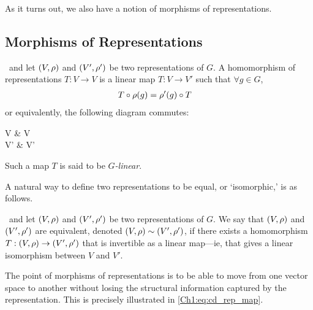 As it turns out, we also have a notion of morphisms of representations.

\subsection{Morphisms of Representations}

\begin{boxdefinition}
    \ and let $\left( V,\rho \right)$ and $\left( V',\rho' \right)$ be two representations of $G$. A homomorphism of representations $T : V \to V$ is a linear map $T : V \to V'$ such that $\forall g \in G$,
    \begin{align*}
        T \circ \rho\!\left( g \right) &= \rho'(g) \circ T
    \end{align*}
    or equivalently, the following diagram commutes:
    \begin{cd}
        V \arrow[r, "\rho(g)"] \arrow[d, "T"'] & V \arrow[d, "T"] \\
        V' \arrow[r, "\rho'(g)"'] & V'
        \label{Ch1:eq:cd_rep_map}
    \end{cd}
    Such a map $T$ is said to be \textit{$G$-linear}.
\end{boxdefinition}

A natural way to define two representations to be equal, or `isomorphic,' is as follows.

\begin{definition}
    \ and let $\left( V,\rho \right)$ and $\left( V',\rho' \right)$ be two representations of $G$. We say that $\left( V,\rho \right)$ and $\left( V',\rho' \right)$ are equivalent, denoted $\left( V,\rho \right) \sim \left( V',\rho' \right)$, if there exists a homomorphism $T : \left( V,\rho \right) \to \left( V',\rho' \right)$ that is invertible as a linear map---ie, that gives a linear isomorphism between $V$ and $V'$.
\end{definition}

The point of morphisms of representations is to be able to move from one vector space to another without losing the structural information captured by the representation. This is precisely illustrated in \eqref{Ch1:eq:cd_rep_map}.

